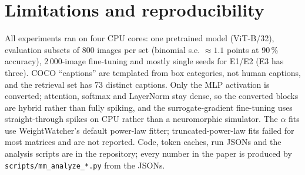 \section{Limitations and reproducibility}
All experiments ran on four CPU cores: one pretrained model (ViT-B/32), evaluation subsets of 800 images per set (binomial s.e. $\approx 1.1$ points at 90\,\% accuracy), 2\,000-image fine-tuning and mostly single seeds for E1/E2 (E3 has three). COCO ``captions'' are templated from box categories, not human captions, and the retrieval set has 73 distinct captions. Only the MLP activation is converted; attention, softmax and LayerNorm stay dense, so the converted blocks are hybrid rather than fully spiking, and the surrogate-gradient fine-tuning uses straight-through spikes on CPU rather than a neuromorphic simulator. The $\alpha$ fits use WeightWatcher's default power-law fitter; truncated-power-law fits failed for most matrices and are not reported. Code, token caches, run JSONs and the analysis scripts are in the repository; every number in the paper is produced by \texttt{scripts/mm\_analyze\_*.py} from the JSONs.

